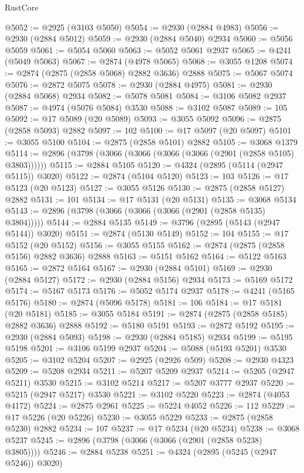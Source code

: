 \begin{lexlean}{RustCore}
\begin{coremodule}
@5052 := @2925 (@3103 @5050)
@5054 := @2930 (@2884 @4983)
@5056 := @2930 (@2884 @5012)
@5059 := @2930 (@2884 @5040) @2934
@5060 := @5056 @5059
@5061 := @5054 @5060
@5063 := @5052 @5061 @2937
@5065 := @4241 (@5049 @5063)
@5067 := @2874 (@4978 @5065)
@5068 := @3055 @1208
@5074 := @2874 (@2875 (@2858 @5068) @2882 @3636) @2888
@5075 := @5067 @5074
@5076 := @2872 @5075
@5078 := @2930 (@2884 @4975)
@5081 := @2930 (@2884 @5068) @2934
@5082 := @5078 @5081
@5084 := @3106 @5082 @2937
@5087 := @4974 (@5076 @5084) @3530
@5088 := @3102 @5087
@5089 := 105
@5092 := @17 @5089 (@20 @5089)
@5093 := @3055 @5092
@5096 := @2875 (@2858 @5093) @2882
@5097 := 102
@5100 := @17 @5097 (@20 @5097)
@5101 := @3055 @5100
@5104 := @2875 (@2858 @5101) @2882
@5105 := @3068 @1379
@5114 := @2896 (@3798 (@3066 (@3066 (@3066 (@3066 (@2901 (@2858 @5105) @3803))))))
@5115 := @2884 @5105
@5120 := @4324 (@2895 (@5114 (@2947 @5115)) @3020)
@5122 := @2874 (@5104 @5120)
@5123 := 103
@5126 := @17 @5123 (@20 @5123)
@5127 := @3055 @5126
@5130 := @2875 (@2858 @5127) @2882
@5131 := 101
@5134 := @17 @5131 (@20 @5131)
@5135 := @3068 @5134
@5143 := @2896 (@3798 (@3066 (@3066 (@3066 (@2901 (@2858 @5135) @3804)))))
@5144 := @2884 @5135
@5149 := @3796 (@2895 (@5143 (@2947 @5144)) @3020)
@5151 := @2874 (@5130 @5149)
@5152 := 104
@5155 := @17 @5152 (@20 @5152)
@5156 := @3055 @5155
@5162 := @2874 (@2875 (@2858 @5156) @2882 @3636) @2888
@5163 := @5151 @5162
@5164 := @5122 @5163
@5165 := @2872 @5164
@5167 := @2930 (@2884 @5101)
@5169 := @2930 (@2884 @5127)
@5172 := @2930 (@2884 @5156) @2934
@5173 := @5169 @5172
@5174 := @5167 @5173
@5176 := @5052 @5174 @2937
@5178 := @4241 (@5165 @5176)
@5180 := @2874 (@5096 @5178)
@5181 := 106
@5184 := @17 @5181 (@20 @5181)
@5185 := @3055 @5184
@5191 := @2874 (@2875 (@2858 @5185) @2882 @3636) @2888
@5192 := @5180 @5191
@5193 := @2872 @5192
@5195 := @2930 (@2884 @5093)
@5198 := @2930 (@2884 @5185) @2934
@5199 := @5195 @5198
@5201 := @3106 @5199 @2937
@5204 := @5088 (@5193 @5201) @3530
@5205 := @3102 @5204
@5207 := @2925 (@2926 @509)
@5208 := @2930 @4323
@5209 := @5208 @2934
@5211 := @5207 @5209 @2937
@5214 := @5205 (@2947 @5211) @3530
@5215 := @3102 @5214
@5217 := @5207 @3777 @2937
@5220 := @5215 (@2947 @5217) @3530
@5221 := @3102 @5220
@5223 := @2874 (@4053 @4172)
@5224 := @2875 @2961
@5225 := @5224 @4052
@5226 := 112
@5229 := @17 @5226 (@20 @5226)
@5230 := @3055 @5229
@5233 := @2875 (@2858 @5230) @2882
@5234 := 107
@5237 := @17 @5234 (@20 @5234)
@5238 := @3068 @5237
@5245 := @2896 (@3798 (@3066 (@3066 (@2901 (@2858 @5238) @3805))))
@5246 := @2884 @5238
@5251 := @4324 (@2895 (@5245 (@2947 @5246)) @3020)

\end{coremodule}
\end{lexlean}
